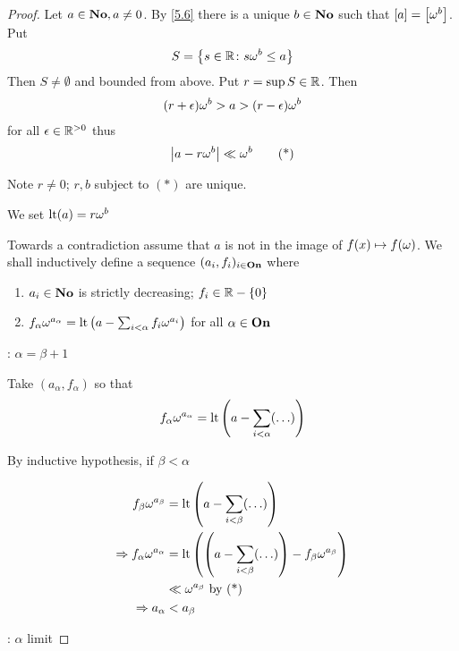 \begin{proof} %

Let $a \in \mathbf{No}, a \neq 0$. By \eqref{5.6} there is a unique $b \in \mathbf{No}$ such that $\left[ a \right] = \left[ \omega^b \right]$.
Put
\begin{align*}
	S = \left\{ s \in \mathbb{R} \colon s\omega^b \leq a \right\}
\end{align*}
Then $S \neq \emptyset$ and bounded from above.
Put $r = \sup S \in \mathbb{R}$.
Then
\begin{align*}
	(r + \epsilon)\omega^b > a > (r - \epsilon)\omega^b
\end{align*}
for all $\epsilon \in \mathbb{R}^{>0}$
thus
\begin{align*}
	\left| a - r\omega^b \right| \ll \omega^b \tag{*}
\end{align*}

Note $r \neq 0$; $r,b$ subject to $(*)$ are unique.

We set $\operatorname{lt}(a) = r\omega^b$

Towards a contradiction assume that $a$ is not in the image of $f(x) \mapsto f(\omega)$.
We shall inductively define a sequence $(a_i, f_i)_{i \in \mathbf{On}}$ where 

\begin{enumerate}
  \item $a_i \in \mathbf{No}$ is strictly decreasing; $f_i \in \mathbb{R} - \{0\}$
  \item $f_\alpha \omega^{a_\alpha} = \operatorname{lt}\left( a - \sum_{i < \alpha} f_i\omega^{a_i} \right)$ for all $\alpha \in \mathbf{On}$
\end{enumerate}

: $\alpha = \beta + 1$

Take $(a_\alpha, f_\alpha)$ so that
\begin{align*}
	f_\alpha\omega^{a_\alpha} = \operatorname{lt}\left( a - \sum_{i < \alpha}(\ldots) \right)
\end{align*}

By inductive hypothesis, if $\beta < \alpha$

\begin{align*}
	f_\beta\omega^{a_\beta} &= \operatorname{lt}\left( a - \sum_{i < \beta}(\ldots) \right) \\
	\Rightarrow f_\alpha\omega^{a_\alpha} &= \operatorname{lt}\left( \left( a - \sum_{i < \beta}(\ldots) \right) - f_\beta\omega^{a_\beta} \right) \\
	&\ll \omega^{a_\beta} \text{ by (*)} \\
	\Rightarrow a_\alpha &< a_\beta
\end{align*}

: $\alpha$ limit


\end{proof}
